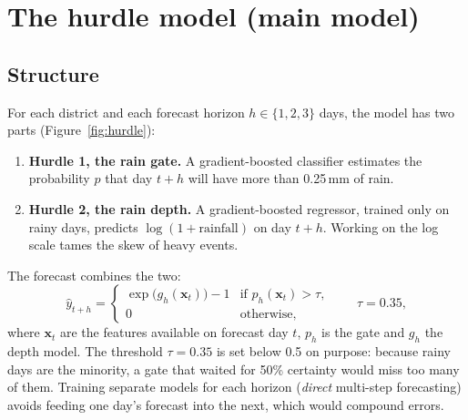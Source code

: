 \section{The hurdle model (main model)}

\subsection{Structure}
For each district and each forecast horizon $h \in \{1,2,3\}$ days, the model has two parts (Figure~\ref{fig:hurdle}):
\begin{enumerate}
	\item \textbf{Hurdle 1, the rain gate.} A gradient-boosted classifier estimates the probability $p$ that day $t+h$ will have more than 0.25\,mm of rain.
	\item \textbf{Hurdle 2, the rain depth.} A gradient-boosted regressor, trained only on rainy days, predicts $\log(1+\text{rainfall})$ on day $t+h$. Working on the log scale tames the skew of heavy events.
\end{enumerate}
The forecast combines the two:
\begin{equation}
	\hat{y}_{t+h} =
	\begin{cases}
		\exp\big(g_h(\mathbf{x}_t)\big) - 1 & \text{if } p_h(\mathbf{x}_t) > \tau,\\
		0 & \text{otherwise,}
	\end{cases}
	\qquad \tau = 0.35,
\end{equation}
where $\mathbf{x}_t$ are the features available on forecast day $t$, $p_h$ is the gate and $g_h$ the depth model. The threshold $\tau = 0.35$ is set below 0.5 on purpose: because rainy days are the minority, a gate that waited for 50\% certainty would miss too many of them. Training separate models for each horizon (\emph{direct} multi-step forecasting) avoids feeding one day's forecast into the next, which would compound errors.

